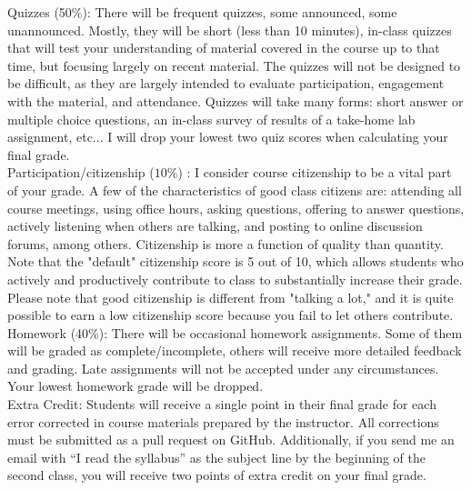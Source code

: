 \documentclass[10pt]{article}
\begin{document}
\noindent Quizzes (50\%): There will be frequent quizzes, some announced, some unannounced. Mostly, they will be short (less than 10 minutes), in-class quizzes that will test your understanding of material covered in the course up to that time, but focusing largely on recent material. The quizzes will not be designed to be difficult, as they are largely intended to evaluate participation, engagement with the material, and attendance. Quizzes will take many forms: short answer or multiple choice questions, an in-class survey of results of a take-home lab assignment, etc... I will drop your lowest two quiz scores when calculating your final grade.  \\

\noindent Participation/citizenship ($10\%$) :
I consider course citizenship to be a vital part of your grade. A few of the characteristics of good class citizens are: attending all course meetings, using office hours, asking questions, offering to answer questions, actively listening when others are talking, and posting to online discussion forums, among others. Citizenship is more a function of quality than quantity. Note that the "default" citizenship score is 5 out of 10, which allows students who actively and productively contribute to class to substantially increase their grade. Please note that good citizenship is different from "talking a lot," and it is quite possible to earn a low citizenship score because you fail to let others contribute.\\


\noindent Homework (40\%): There will be occasional homework assignments. Some of them will be graded as complete/incomplete, others will receive more detailed feedback and grading. Late assignments will not be accepted under any circumstances. Your lowest homework grade will be dropped. \\


\noindent Extra Credit: Students will receive a single point in their final grade for each error corrected in course materials prepared by the instructor. All corrections must be submitted as a pull request on GitHub. Additionally, if you send me an email with ``I read the syllabus'' as the subject line by the beginning of the second class, you will receive two points of extra credit on your final grade.
\end{document}
